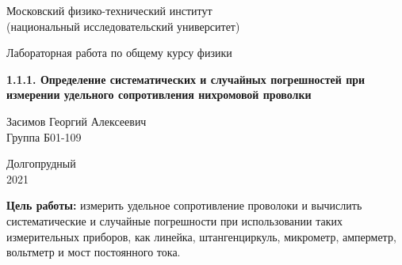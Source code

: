 \documentclass[a4paper, 12pt]{article} %
\begin{document}


\begin{titlepage}

    \newpage
    \begin{center}
        \normalsize Московский физико-технический институт \\(национальный исследовательский университет)
    \end{center}

    \vspace{6em}

    \begin{center}
        \Large Лабораторная работа по общему курсу физики\\
    \end{center}

    \vspace{1em}

    \begin{center}
        \Large \textbf{1.1.1. Определение систематических и случайных погрешностей при измерении удельного сопротивления нихромовой проволки}
    \end{center}

    \vspace{2em}

    \begin{center}
        \large Засимов Георгий Алексеевич \\
        Группа Б01-109
    \end{center}

    \vspace{\fill}

    \begin{center}
    Долгопрудный \\2021
    \end{center}
    
\end{titlepage}



    \thispagestyle{empty}
    \newpage
    \tableofcontents
    \newpage
    \setcounter{page}{1}


\textbf{Цель работы:} измерить удельное сопротивление проволоки и вычислить систематические и случайные погрешности при использовании таких измерительных приборов, как линейка, штангенциркуль, микрометр, амперметр, вольтметр и мост постоянного тока.\\
\end{document}
